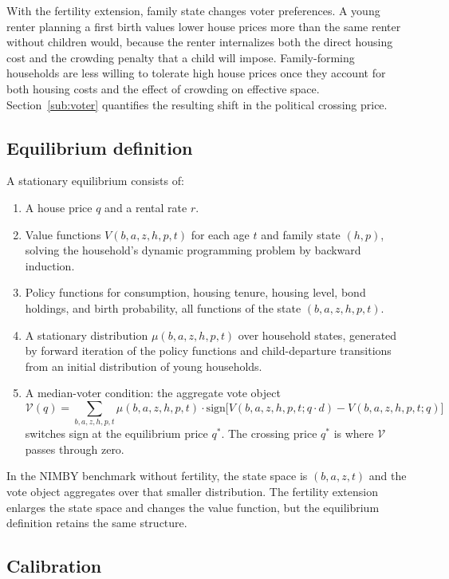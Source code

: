 With the fertility extension, family state changes voter preferences. A young renter planning a first birth values lower house prices more than the same renter without children would, because the renter internalizes both the direct housing cost and the crowding penalty that a child will impose. Family-forming households are less willing to tolerate high house prices once they account for both housing costs and the effect of crowding on effective space. Section~\ref{sub:voter} quantifies the resulting shift in the political crossing price.

\subsection{Equilibrium definition}

A stationary equilibrium consists of:
\begin{enumerate}
\item A house price $q$ and a rental rate $r$.
\item Value functions $V(b, a, z, h, p, t)$ for each age $t$ and family state $(h, p)$, solving the household's dynamic programming problem by backward induction.
\item Policy functions for consumption, housing tenure, housing level, bond holdings, and birth probability, all functions of the state $(b, a, z, h, p, t)$.
\item A stationary distribution $\mu(b, a, z, h, p, t)$ over household states, generated by forward iteration of the policy functions and child-departure transitions from an initial distribution of young households.
\item A median-voter condition: the aggregate vote object
\begin{equation}
\mathcal{V}(q) = \sum_{b, a, z, h, p, t} \mu(b, a, z, h, p, t) \cdot \text{sign}\!\bigl[V(b, a, z, h, p, t; q \cdot d) - V(b, a, z, h, p, t; q)\bigr]
\end{equation}
switches sign at the equilibrium price $q^{*}$. The crossing price $q^{*}$ is where $\mathcal{V}$ passes through zero.
\end{enumerate}

In the NIMBY benchmark without fertility, the state space is $(b, a, z, t)$ and the vote object aggregates over that smaller distribution. The fertility extension enlarges the state space and changes the value function, but the equilibrium definition retains the same structure.

\subsection{Calibration}


